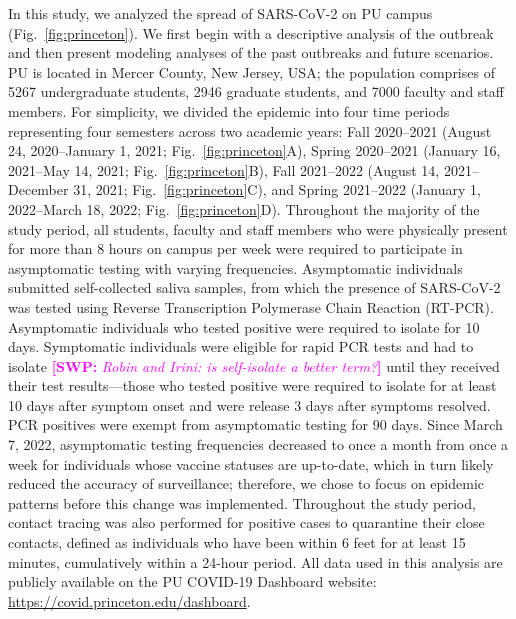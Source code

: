 \documentclass[12pt]{article}
\newcommand{\fref}[1]{Fig.~\ref{fig:#1}}
\newcommand{\comment}[3]{\textcolor{#1}{\textbf{[#2: }\textsl{#3}\textbf{]}}}
\newcommand{\swp}[1]{\comment{magenta}{SWP}{#1}}
\begin{document}
In this study, we analyzed the spread of SARS-CoV-2 on PU campus (\fref{princeton}).
We first begin with a descriptive analysis of the outbreak and then present modeling analyses of the past outbreaks and future scenarios.
PU is located in Mercer County, New Jersey, USA;
the population comprises of 5267 undergraduate students, 2946 graduate students, and 7000 faculty and staff members.
For simplicity, we divided the epidemic into four time periods representing four semesters across two academic years: Fall 2020--2021 (August 24, 2020--January 1, 2021; \fref{princeton}A), Spring 2020--2021 (January 16, 2021--May 14, 2021; \fref{princeton}B), Fall 2021--2022 (August 14, 2021--December 31, 2021; \fref{princeton}C), and Spring 2021--2022 (January 1, 2022--March 18, 2022; \fref{princeton}D).
Throughout the majority of the study period, all students, faculty and staff members who were physically present for more than 8 hours on campus per week were required to participate in asymptomatic testing with varying frequencies.
Asymptomatic individuals submitted self-collected saliva samples, from which the presence of SARS-CoV-2 was tested using Reverse Transcription Polymerase Chain Reaction (RT-PCR).  
Asymptomatic individuals who tested positive were required to isolate for 10 days.
Symptomatic individuals were eligible for rapid PCR tests and had to isolate \swp{Robin and Irini: is self-isolate a better term?} until they received their test results---those who tested positive were required to isolate for at least 10 days after symptom onset and were release 3 days after symptoms resolved.
PCR positives were exempt from asymptomatic testing for 90 days.
Since March 7, 2022, asymptomatic testing frequencies decreased to once a month from once a week for individuals whose vaccine statuses are up-to-date, which in turn likely reduced the accuracy of surveillance; therefore, we chose to focus on epidemic patterns before this change was implemented.
Throughout the study period, contact tracing was also performed for positive cases to quarantine their close contacts, defined as individuals who have been within 6 feet for at least 15 minutes, cumulatively within a 24-hour period.
All data used in this analysis are publicly available on the PU COVID-19 Dashboard website: \url{https://covid.princeton.edu/dashboard}.
\end{document}
